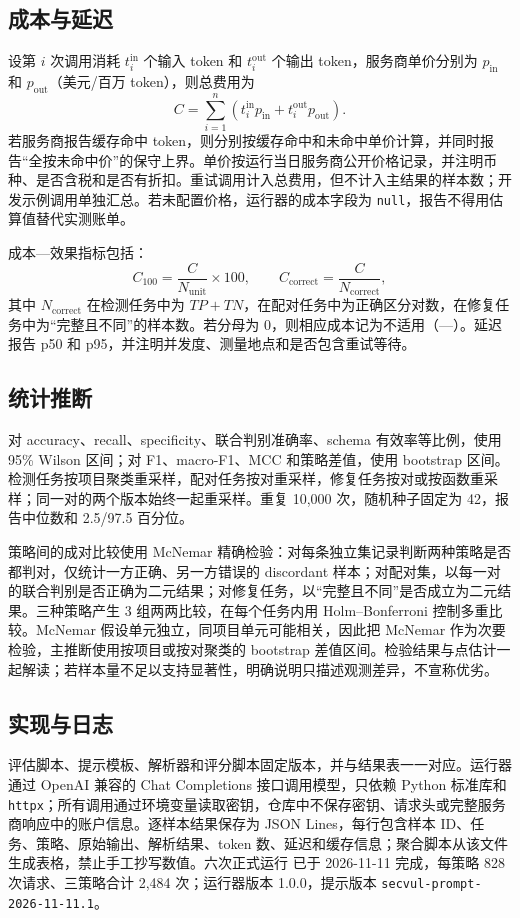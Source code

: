 \documentclass[conference]{IEEEtran}
\begin{document}
\subsection{成本与延迟}
设第 $i$ 次调用消耗 $t_i^{\mathrm{in}}$ 个输入 token 和 $t_i^{\mathrm{out}}$ 个输出 token，服务商单价分别为 $p_{\mathrm{in}}$ 和 $p_{\mathrm{out}}$（美元/百万 token），则总费用为
\begin{equation}
C=\sum_{i=1}^{n}\left(t_i^{\mathrm{in}}p_{\mathrm{in}}+t_i^{\mathrm{out}}p_{\mathrm{out}}\right).
\end{equation}
若服务商报告缓存命中 token，则分别按缓存命中和未命中单价计算，并同时报告“全按未命中价”的保守上界。单价按运行当日服务商公开价格记录，并注明币种、是否含税和是否有折扣。重试调用计入总费用，但不计入主结果的样本数；开发示例调用单独汇总。若未配置价格，运行器的成本字段为 \texttt{null}，报告不得用估算值替代实测账单。

成本—效果指标包括：
\begin{equation}
C_{100}=\frac{C}{N_{\mathrm{unit}}}\times 100,\qquad
C_{\mathrm{correct}}=\frac{C}{N_{\mathrm{correct}}},
\end{equation}
其中 $N_{\mathrm{correct}}$ 在检测任务中为 $TP+TN$，在配对任务中为正确区分对数，在修复任务中为“完整且不同”的样本数。若分母为 0，则相应成本记为不适用（---）。延迟报告 p50 和 p95，并注明并发度、测量地点和是否包含重试等待。

\subsection{统计推断}
对 accuracy、recall、specificity、联合判别准确率、schema 有效率等比例，使用 95\% Wilson 区间；对 F1、macro-F1、MCC 和策略差值，使用 bootstrap 区间。检测任务按项目聚类重采样，配对任务按对重采样，修复任务按对或按函数重采样；同一对的两个版本始终一起重采样。重复 10{,}000 次，随机种子固定为 42，报告中位数和 2.5/97.5 百分位。

策略间的成对比较使用 McNemar 精确检验：对每条独立集记录判断两种策略是否都判对，仅统计一方正确、另一方错误的 discordant 样本；对配对集，以每一对的联合判别是否正确为二元结果；对修复任务，以“完整且不同”是否成立为二元结果。三种策略产生 3 组两两比较，在每个任务内用 Holm--Bonferroni 控制多重比较。McNemar 假设单元独立，同项目单元可能相关，因此把 McNemar 作为次要检验，主推断使用按项目或按对聚类的 bootstrap 差值区间。检验结果与点估计一起解读；若样本量不足以支持显著性，明确说明只描述观测差异，不宣称优劣。

\subsection{实现与日志}
评估脚本、提示模板、解析器和评分脚本固定版本，并与结果表一一对应。运行器  通过 OpenAI 兼容的 Chat Completions 接口调用模型，只依赖 Python 标准库和 \texttt{httpx}；所有调用通过环境变量读取密钥，仓库中不保存密钥、请求头或完整服务商响应中的账户信息。逐样本结果保存为 JSON Lines，每行包含样本 ID、任务、策略、原始输出、解析结果、token 数、延迟和缓存信息；聚合脚本从该文件生成表格，禁止手工抄写数值。六次正式运行  已于 2026-11-11 完成，每策略 828 次请求、三策略合计 2{,}484 次；运行器版本 1.0.0，提示版本 \texttt{secvul-prompt-2026-11-11.1}。
\end{document}
